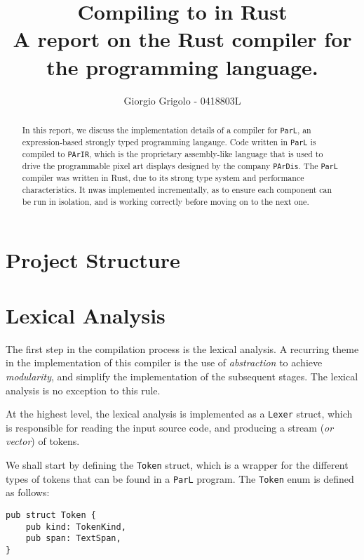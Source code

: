 \documentclass{article}
\title{Compiling \code{ParL} to \code{PArIR} in Rust \\{\normalsize A report on the Rust
compiler for the \code{ParL} programming language.}}
\author{Giorgio Grigolo - 0418803L}
\date{}
\newcommand{\code}[1]{\texttt{#1}}
\begin{document}
\maketitle
\tableofcontents

\begin{abstract}
    In this report, we discuss the implementation details of a
    compiler for \code{ParL}, an expression-based strongly typed programming
    langauge. Code written in \code{ParL} is compiled to \code{PArIR}, which is
    the proprietary assembly-like language that is used to drive the
    programmable pixel art displays designed by the company \code{PArDis}. The
    \code{ParL} compiler was written in Rust, due to its strong type system and
    performance characteristics. It nwas implemented incrementally, as
    to ensure each component can be run in isolation, and is working correctly
    before moving on to the next one.
\end{abstract}

\newpage

\section{Project Structure}

\newpage

\section{Lexical Analysis}

The first step in the compilation process is the lexical analysis. A recurring
theme in the implementation of this compiler is the use of \textit{abstraction}
to achieve \textit{modularity}, and simplify the implementation of the
subsequent stages. The lexical analysis is no exception to this rule.

At the highest level, the lexical analysis is implemented as a \code{Lexer}
struct, which is responsible for reading the input source code, and producing a
stream (\textit{or vector}) of tokens.

We shall start by defining the \code{Token} struct, which is a wrapper for the
different types of tokens that can be found in a \code{ParL} program. The
\code{Token} enum is defined as follows:

\begin{mainbox}{}
    \lstset{belowskip=0pt, aboveskip=0pt}
    \begin{lstlisting}
pub struct Token {
    pub kind: TokenKind,
    pub span: TextSpan,
}
    \end{lstlisting}
\end{mainbox}
\end{document}
